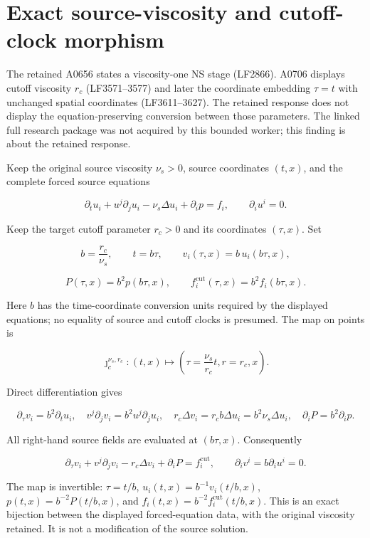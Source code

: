 \section{Exact source-viscosity and cutoff-clock
morphism}\label{proof11:exact-source-viscosity-and-cutoff-clock-morphism}

The retained A0656 states a viscosity-one NS stage (LF2866). A0706
displays cutoff viscosity \(r_c\) (LF3571--3577) and later the
coordinate embedding \(\tau=t\) with unchanged spatial coordinates
(LF3611--3627). The retained response does not display the
equation-preserving conversion between those parameters. The linked full
research package was not acquired by this bounded worker; this finding
is about the retained response.

Keep the original source viscosity \(\nu_s>0\), source coordinates
\((t,x)\), and the complete forced source equations

\[
\partial_tu_i+u^j\partial_ju_i-\nu_s\Delta u_i+\partial_ip=f_i,
\qquad \partial_iu^i=0.
\]

Keep the target cutoff parameter \(r_c>0\) and its coordinates
\((\tau,x)\). Set

\[
b=\frac{r_c}{\nu_s},\qquad
t=b\tau,
\qquad v_i(\tau,x)=b\,u_i(b\tau,x),
\]

\[
P(\tau,x)=b^2p(b\tau,x),
\qquad f_i^{\mathrm{cut}}(\tau,x)=b^2f_i(b\tau,x).
\]

Here \(b\) has the time-coordinate conversion units required by the
displayed equations; no equality of source and cutoff clocks is
presumed. The map on points is

\[
\jmath_c^{\nu_s,r_c}:(t,x)\longmapsto
\left(\tau=\frac{\nu_s}{r_c}t,r=r_c,x\right).
\]

Direct differentiation gives

\[
\partial_\tau v_i=b^2\partial_tu_i,
\quad v^j\partial_jv_i=b^2u^j\partial_ju_i,
\quad r_c\Delta v_i=r_cb\Delta u_i=b^2\nu_s\Delta u_i,
\quad \partial_iP=b^2\partial_ip.
\]

All right-hand source fields are evaluated at \((b\tau,x)\).
Consequently

\[
\partial_\tau v_i+v^j\partial_jv_i-r_c\Delta v_i+\partial_iP
=f_i^{\mathrm{cut}},
\qquad \partial_iv^i=b\partial_iu^i=0.
\]

The map is invertible: \(\tau=t/b\), \(u_i(t,x)=b^{-1}v_i(t/b,x)\),
\(p(t,x)=b^{-2}P(t/b,x)\), and
\(f_i(t,x)=b^{-2}f_i^{\mathrm{cut}}(t/b,x)\). This is an exact bijection
between the displayed forced-equation data, with the original viscosity
retained. It is not a modification of the source solution.

